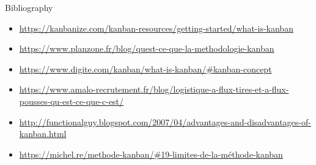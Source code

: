 \documentclass[10pt]{beamer}
\begin{document}
\begin{frame}{Bibliography}
    \begin{itemize}
        \item \href{https://kanbanize.com/kanban-resources/getting-started/what-is-kanban}{https://kanbanize.com/kanban-resources/getting-started/what-is-kanban}
        \item \href{https://www.planzone.fr/blog/quest-ce-que-la-methodologie-kanban}{https://www.planzone.fr/blog/quest-ce-que-la-methodologie-kanban}
        \item \href{https://www.digite.com/kanban/what-is-kanban/\#kanban-concept}{https://www.digite.com/kanban/what-is-kanban/\#kanban-concept}
        \item \href{https://www.amalo-recrutement.fr/blog/logistique-a-flux-tires-et-a-flux-pousses-qu-est-ce-que-c-est/}{https://www.amalo-recrutement.fr/blog/logistique-a-flux-tires-et-a-flux-pousses-qu-est-ce-que-c-est/}
        \item \href{http://functionalguy.blogspot.com/2007/04/advantages-and-disadvantages-of-kanban.html}{http://functionalguy.blogspot.com/2007/04/advantages-and-disadvantages-of-kanban.html}
        \item \href{https://michel.re/methode-kanban/\#19-limites-de-la-méthode-kanban}{https://michel.re/methode-kanban/\#19-limites-de-la-méthode-kanban}
    \end{itemize}
\end{frame}
\end{document}
